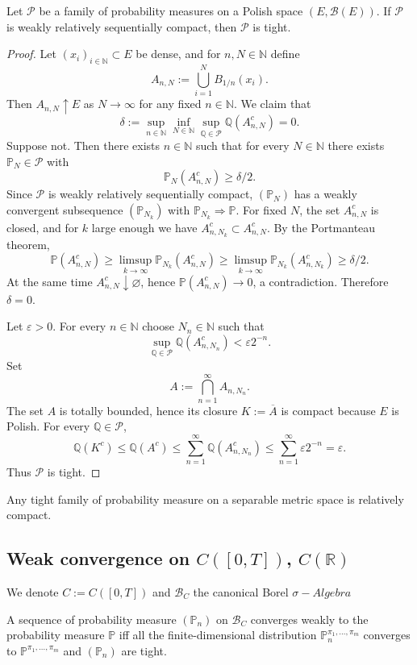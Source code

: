 \begin{lemma}
Let $\mathcal{P}$ be a family of probability measures on a Polish space $(E,\mathcal{B}(E))$.
If $\mathcal{P}$ is weakly relatively sequentially compact, then $\mathcal{P}$ is tight.
\end{lemma}
\begin{proof}
Let $(x_i)_{i\in\mathbb{N}} \subset E$ be dense, and for $n,N\in\mathbb{N}$ define
\[
	A_{n,N}:=\bigcup_{i=1}^N B_{1/n}(x_i).
\]
Then $A_{n,N}\uparrow E$ as $N\to\infty$ for any fixed $n\in\mathbb{N}$. We claim that
\[
	\delta:=\sup_{n\in\mathbb{N}}\inf_{N\in\mathbb{N}}
	\sup_{\mathbb{Q}\in\mathcal{P}}\mathbb{Q}(A_{n,N}^c)=0.
\]
Suppose not. Then there exists $n\in\mathbb{N}$ such that for every $N\in\mathbb{N}$
there exists $\mathbb{P}_N\in\mathcal{P}$ with
\[
	\mathbb{P}_N(A_{n,N}^c)\ge \delta/2.
\]
Since $\mathcal{P}$ is weakly relatively sequentially compact, $(\mathbb{P}_N)$ has a weakly convergent
subsequence $(\mathbb{P}_{N_k})$ with $\mathbb{P}_{N_k}\Rightarrow\mathbb{P}$.
For fixed $N$, the set $A_{n,N}^c$ is closed, and for $k$ large enough we have
$A_{n,N_k}^c\subset A_{n,N}^c$. By the Portmanteau theorem,
\[
	\mathbb{P}(A_{n,N}^c)\ge \limsup_{k\to\infty}\mathbb{P}_{N_k}(A_{n,N}^c)
	\ge \limsup_{k\to\infty}\mathbb{P}_{N_k}(A_{n,N_k}^c)\ge \delta/2.
\]
At the same time $A_{n,N}^c\downarrow\varnothing$, hence $\mathbb{P}(A_{n,N}^c)\to 0$, a contradiction.
Therefore $\delta=0$.

Let $\varepsilon>0$. For every $n\in\mathbb{N}$ choose $N_n\in\mathbb{N}$ such that
\[
	\sup_{\mathbb{Q}\in\mathcal{P}}\mathbb{Q}(A_{n,N_n}^c)<\varepsilon 2^{-n}.
\]
Set
\[
	A:=\bigcap_{n=1}^\infty A_{n,N_n}.
\]
The set $A$ is totally bounded, hence its closure $K:=\overline{A}$ is compact because $E$ is
Polish. For every $\mathbb{Q}\in\mathcal{P}$,
\[
	\mathbb{Q}(K^c)\le \mathbb{Q}(A^c)\le \sum_{n=1}^\infty \mathbb{Q}(A_{n,N_n}^c)
	\le \sum_{n=1}^\infty \varepsilon 2^{-n}=\varepsilon.
\]
Thus $\mathcal{P}$ is tight.
\end{proof}

\begin{theorem}
	Any tight family of probability measure on a separable metric space is relatively compact.
\end{theorem}


\subsection{\texorpdfstring{Weak convergence on $C([0, T])$, $C(\mathbb{R})$}{Weak convergence on C([0, T]), C(R)}}
We denote $C:= C([0, T])$ and $\mathcal{B}_C$ the canonical Borel $\sigma-Algebra$
\begin{theorem}
	A sequence of probability measure $(\mathbb{P}_n)$ on $\mathcal{B}_C$ converges weakly to the probability measure $\mathbb{P}$ iff all the finite-dimensional distribution $\mathbb{P}^{\pi_1, \dots, \pi_m}_n$ converges to $\mathbb{P}^{\pi_1, \dots, \pi_m}$ and $(\mathbb{P}_n)$ are tight.
\end{theorem}

